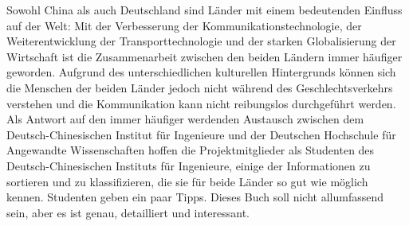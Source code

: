 \normalfont\Huge\sffamily{} \par

\thispagestyle{empty}
 \vspace*{3cm}
 \normalfont\normalsize
 \justify
Sowohl China als auch Deutschland sind Länder mit einem bedeutenden Einfluss auf der Welt: Mit der Verbesserung der Kommunikationstechnologie, der Weiterentwicklung der Transporttechnologie und der starken Globalisierung der Wirtschaft ist die Zusammenarbeit zwischen den beiden Ländern immer häufiger geworden. Aufgrund des unterschiedlichen kulturellen Hintergrunds können sich die Menschen der beiden Länder jedoch nicht während des Geschlechtsverkehrs verstehen und die Kommunikation kann nicht reibungslos durchgeführt werden. Als Antwort auf den immer häufiger werdenden Austausch zwischen dem Deutsch-Chinesischen Institut für Ingenieure und der Deutschen Hochschule für Angewandte Wissenschaften hoffen die Projektmitglieder als Studenten des Deutsch-Chinesischen Instituts für Ingenieure, einige der Informationen zu sortieren und zu klassifizieren, die sie für beide Länder so gut wie möglich kennen. Studenten geben ein paar Tipps. Dieses Buch soll nicht allumfassend sein, aber es ist genau, detailliert und interessant.


